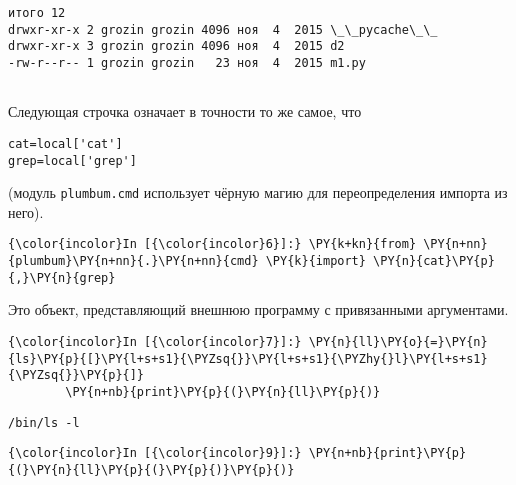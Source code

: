     \begin{Verbatim}[commandchars=\\\{\}]
итого 12
drwxr-xr-x 2 grozin grozin 4096 ноя  4  2015 \_\_pycache\_\_
drwxr-xr-x 3 grozin grozin 4096 ноя  4  2015 d2
-rw-r--r-- 1 grozin grozin   23 ноя  4  2015 m1.py


    \end{Verbatim}

    Следующая строчка означает в точности то же самое, что

\begin{verbatim}
cat=local['cat']
grep=local['grep']
\end{verbatim}

(модуль \texttt{plumbum.cmd} использует чёрную магию для переопределения
импорта из него).

    \begin{Verbatim}[commandchars=\\\{\}]
{\color{incolor}In [{\color{incolor}6}]:} \PY{k+kn}{from} \PY{n+nn}{plumbum}\PY{n+nn}{.}\PY{n+nn}{cmd} \PY{k}{import} \PY{n}{cat}\PY{p}{,}\PY{n}{grep}
\end{Verbatim}


    Это объект, представляющий внешнюю программу с привязанными аргументами.

    \begin{Verbatim}[commandchars=\\\{\}]
{\color{incolor}In [{\color{incolor}7}]:} \PY{n}{ll}\PY{o}{=}\PY{n}{ls}\PY{p}{[}\PY{l+s+s1}{\PYZsq{}}\PY{l+s+s1}{\PYZhy{}l}\PY{l+s+s1}{\PYZsq{}}\PY{p}{]}
        \PY{n+nb}{print}\PY{p}{(}\PY{n}{ll}\PY{p}{)}
\end{Verbatim}


    \begin{Verbatim}[commandchars=\\\{\}]
/bin/ls -l

    \end{Verbatim}

    \begin{Verbatim}[commandchars=\\\{\}]
{\color{incolor}In [{\color{incolor}9}]:} \PY{n+nb}{print}\PY{p}{(}\PY{n}{ll}\PY{p}{(}\PY{p}{)}\PY{p}{)}
\end{Verbatim}


